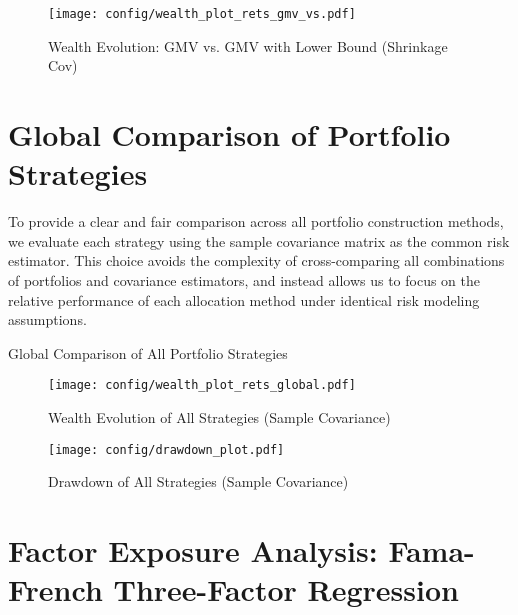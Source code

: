 \documentclass{article}
\begin{document}
\begin{figure}[htbp]
    \centering
    \texttt{[image: config/wealth\_plot\_rets\_gmv\_vs.pdf]}
    \caption{Wealth Evolution: GMV vs. GMV with Lower Bound (Shrinkage Cov)}
    \label{fig:wealth_gmv_vs}
\end{figure}

\newpage
\section{Global Comparison of Portfolio Strategies }

To provide a clear and fair comparison across all portfolio construction methods, we evaluate each strategy using the sample covariance matrix as the common risk estimator. This choice avoids the complexity of cross-comparing all combinations of portfolios and covariance estimators, and instead allows us to focus on the relative performance of each allocation method under identical risk modeling assumptions.

\begin{table}[htbp]
\centering
\caption{Global Comparison of All Portfolio Strategies}
\label{tab:stats_global}
\begin{adjustbox}{max width=\textwidth}
    
\end{adjustbox}
\end{table}



\begin{figure}[htbp]
    \centering
    \texttt{[image: config/wealth\_plot\_rets\_global.pdf]}
    \caption{Wealth Evolution of All Strategies (Sample Covariance)}
    \label{fig:wealth_global}
\end{figure}

\begin{figure}[htbp]
    \centering
    \texttt{[image: config/drawdown\_plot.pdf]}
    \caption{Drawdown of All Strategies (Sample Covariance)}
    \label{fig:drawdown_global}
\end{figure}


\newpage

\section{Factor Exposure Analysis: Fama-French Three-Factor Regression}
\end{document}
